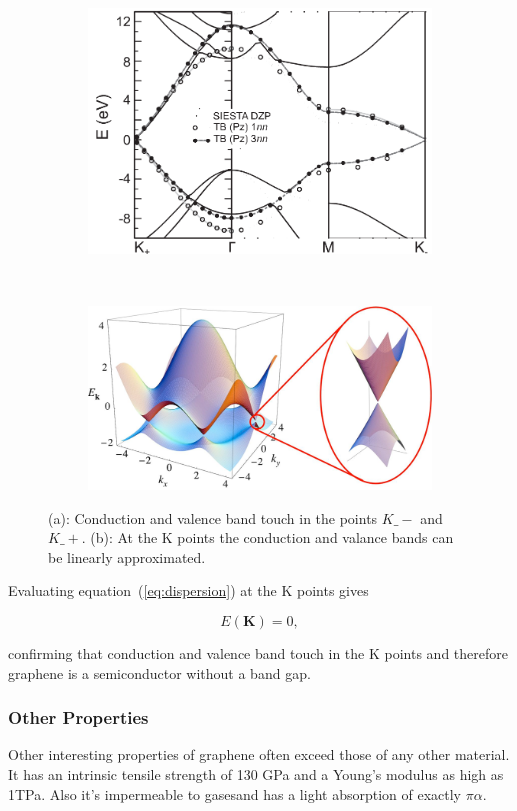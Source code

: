 \begin{figure}[!h]
  \centering
  \begin{subfigure}[b]{0.4\textwidth}
    \caption{}
    \includegraphics[width=\textwidth]{./images/band-2d.png}
  \end{subfigure}
  ~
  \begin{subfigure}[b]{0.4\textwidth}
    \caption{}
    \includegraphics[width=\textwidth]{./images/dispersion.png}
  \end{subfigure}
  \caption { (a): Conduction and valence band touch in the points $K\_-$ and $K\_+$. (b): At the K points the conduction and valance bands can be linearly approximated. }
\end{figure}

Evaluating equation~(\ref{eq:dispersion}) at the K points gives

\begin{equation}
  E(\mathbf{K})=0,
\end{equation}

confirming that conduction and valence band touch in the K points and therefore graphene is a semiconductor without a band gap.

\subsubsection{Other Properties}

Other interesting properties of graphene often exceed those of any other material. It has an intrinsic tensile strength of 130 GPa and a Young's modulus as high as 1TPa\mcite. Also it's impermeable to gases\mcite and has a light absorption of exactly $\pi\alpha$\mcite.
